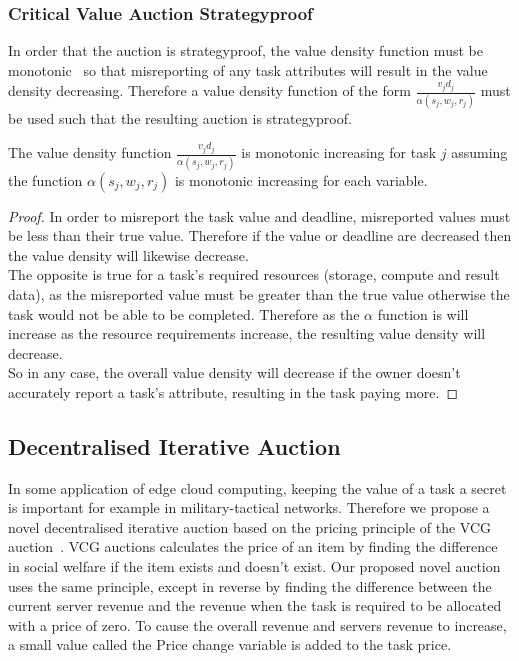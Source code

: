 \subsubsection{Critical Value Auction Strategyproof}
\label{subsubsec:critical-value-auction-strategyproof}
In order that the auction is strategyproof, the value density function must be
monotonic~\cite{nisan2007algorithmic_229_230} so that misreporting of any task attributes will result in the value
density decreasing. Therefore a value density function of the form $\frac{v_j d_j}{\alpha(s_j, w_j, r_j)}$ must be used
such that the resulting auction is strategyproof.
\begin{theorem}
    The value density function $\frac{v_j d_j}{\alpha(s_j, w_j, r_j)}$ is monotonic increasing for task $j$ assuming
    the function $\alpha(s_j, w_j, r_j)$ is monotonic increasing for each variable.
\end{theorem}
\begin{proof}
    In order to misreport the task value and deadline, misreported values must be less than their true value. Therefore
    if the value or deadline are decreased then the value density will likewise decrease. \\
    The opposite is true for a task's required resources (storage, compute and result data), as the misreported value
    must be greater than the true value otherwise the task would not be able to be completed. Therefore as the $\alpha$
    function is will increase as the resource requirements increase, the resulting value density will decrease. \\
    So in any case, the overall value density will decrease if the owner doesn't accurately report a task's attribute,
    resulting in the task paying more.
\end{proof}

\subsection{Decentralised Iterative Auction}
\label{subsec:decentralised-iterative-auction}
In some application of edge cloud computing, keeping the value of a task a secret is important for example in
military-tactical networks. Therefore we propose a novel decentralised iterative auction based on the pricing principle
of the VCG auction~\cite{vickrey,Clarke,groves}. VCG auctions calculates the price of an item by finding the
difference in social welfare if the item exists and doesn't exist. Our proposed novel auction uses the same principle,
except in reverse by finding the difference between the current server revenue and the revenue when the task is
required to be allocated with a price of zero. To cause the overall revenue and servers revenue to increase, a small
value called the Price change variable is added to the task price.

